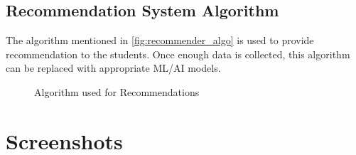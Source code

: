 \subsection{Recommendation System Algorithm}
The algorithm mentioned in \autoref{fig:recommender_algo} is used to provide recommendation to the students. Once enough data is collected, this algorithm can be replaced with appropriate ML/AI models.

\begin{figure}[H]
    \centering
    \caption{Algorithm used for Recommendations}
    \label{fig:recommender_algo}
\end{figure}


\section{Screenshots}

